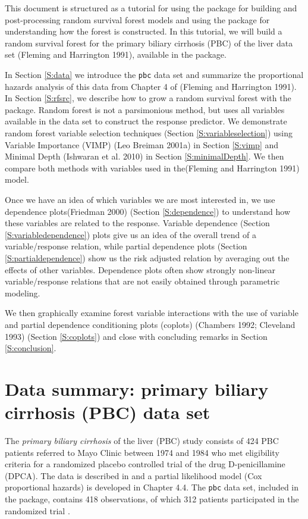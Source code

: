 \documentclass[article]{jss}
\begin{document}
This document is structured as a tutorial for using the
 package for building and post-processing random
survival forest models and using the  package for
understanding how the forest is constructed. In this tutorial, we will
build a random survival forest for the primary biliary cirrhosis (PBC)
of the liver data set (Fleming and Harrington 1991), available in the
 package.

In Section \ref{S:data} we introduce the \texttt{pbc} data set and
summarize the proportional hazards analysis of this data from Chapter 4
of (Fleming and Harrington 1991). In Section \ref{S:rfsrc}, we describe
how to grow a random survival forest with the 
package. Random forest is not a parsimonious method, but uses all
variables available in the data set to construct the response predictor.
We demonstrate random forest variable selection techniques (Section
\ref{S:variableselection}) using Variable Importance (VIMP) (Leo Breiman
2001a) in Section \ref{S:vimp} and Minimal Depth (Ishwaran et al. 2010)
in Section \ref{S:minimalDepth}. We then compare both methods with
variables used in the(Fleming and Harrington 1991) model.

Once we have an idea of which variables we are most interested in, we
use dependence plots(Friedman 2000) (Section \ref{S:dependence}) to
understand how these variables are related to the response. Variable
dependence (Section \ref{S:variabledependence}) plots give us an idea of
the overall trend of a variable/response relation, while partial
dependence plots (Section \ref{S:partialdependence}) show us the risk
adjusted relation by averaging out the effects of other variables.
Dependence plots often show strongly non-linear variable/response
relations that are not easily obtained through parametric modeling.

We then graphically examine forest variable interactions with the use of
variable and partial dependence conditioning plots (coplots) (Chambers
1992; Cleveland 1993) (Section \ref{S:coplots}) and close with
concluding remarks in Section \ref{S:conclusion}.

\section{Data summary: primary biliary cirrhosis (PBC) data
set}\label{data-summary-primary-biliary-cirrhosis-pbc-data-set}

The \emph{primary biliary cirrhosis} of the liver (PBC) study consists
of 424 PBC patients referred to Mayo Clinic between 1974 and 1984 who
met eligibility criteria for a randomized placebo controlled trial of
the drug D-penicillamine (DPCA). The data is described in
\cite[Chapter 0.2]{fleming:1991} and a partial likelihood model (Cox
proportional hazards) is developed in Chapter 4.4. The \texttt{pbc} data
set, included in the  package, contains 418
observations, of which 312 patients participated in the randomized trial
\cite[Appendix D]{fleming:1991}.
\end{document}

